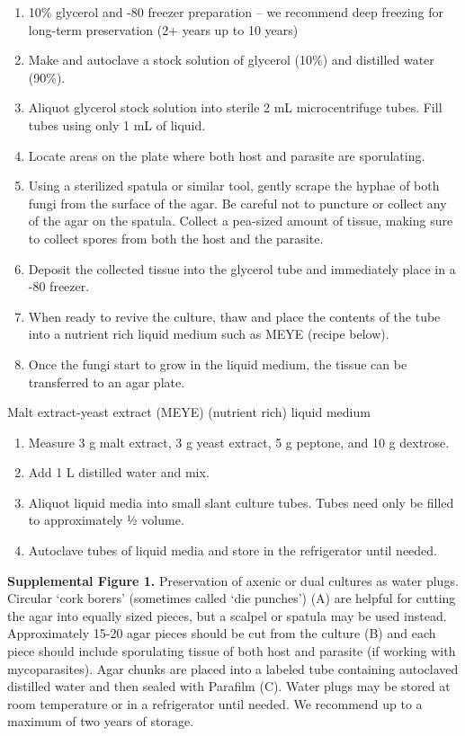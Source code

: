 \documentclass[]{book}
\providecommand{\tightlist}{%
  \setlength{\itemsep}{0pt}\setlength{\parskip}{0pt}}
\begin{document}
\begin{enumerate}
\item
  {10\% glycerol and -80 freezer preparation -- we recommend deep
  freezing for long-term preservation (2+ years up to 10 years)}
\item
  Make and autoclave a stock solution of glycerol (10\%) and distilled
  water (90\%).
\item
  Aliquot glycerol stock solution into sterile 2 mL microcentrifuge
  tubes. Fill tubes using only 1 mL of liquid.
\item
  Locate areas on the plate where both host and parasite are
  sporulating.
\item
  Using a sterilized spatula or similar tool, gently scrape the hyphae
  of both fungi from the surface of the agar. Be careful not to puncture
  or collect any of the agar on the spatula. Collect a pea-sized amount
  of tissue, making sure to collect spores from both the host and the
  parasite.
\item
  Deposit the collected tissue into the glycerol tube and immediately
  place in a -80 freezer.
\item
  When ready to revive the culture, thaw and place the contents of the
  tube into a nutrient rich liquid medium such as MEYE (recipe below).
\item
  Once the fungi start to grow in the liquid medium, the tissue can be
  transferred to an agar plate.
\end{enumerate}

{Malt extract-yeast extract (MEYE) (nutrient rich) liquid medium}

\begin{enumerate}
\def\labelenumi{\arabic{enumi}.}
\tightlist
\item
  Measure 3 g malt extract, 3 g yeast extract, 5 g peptone, and 10 g
  dextrose.
\item
  Add 1 L distilled water and mix.
\item
  Aliquot liquid media into small slant culture tubes. Tubes need only
  be filled to approximately ½ volume.
\item
  Autoclave tubes of liquid media and store in the refrigerator until
  needed.
\end{enumerate}

\textbf{Supplemental Figure 1.} Preservation of axenic or dual cultures
as water plugs. Circular `cork borers' (sometimes called `die punches')
(A) are helpful for cutting the agar into equally sized pieces, but a
scalpel or spatula may be used instead. Approximately 15-20 agar pieces
should be cut from the culture (B) and each piece should include
sporulating tissue of both host and parasite (if working with
mycoparasites). Agar chunks are placed into a labeled tube containing
autoclaved distilled water and then sealed with Parafilm (C). Water
plugs may be stored at room temperature or in a refrigerator until
needed. We recommend up to a maximum of two years of storage.
\end{document}
